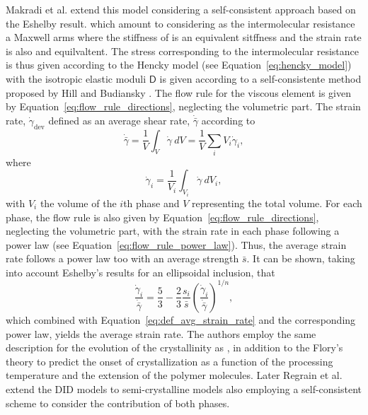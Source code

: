 Makradi et al. \citep{makradiTwophaseSelfconsistentModel2005} extend this model considering a self-consistent approach based on the Eshelby result.
 which amount to considering as the intermolecular resistance a Maxwell arms where the stiffness of is an equivalent sitffness and the strain rate is also and equilvaltent.
The stress corresponding to the intermolecular resistance is thus given according to the Hencky model (see Equation~\eqref{eq:hencky_model}) with the isotropic elastic moduli $\bm{\mathsf D}$ is given according to a self-consistente method proposed by Hill \citep{hillSelfconsistentMechanicsComposite1965} and Budiansky \citep{Budiansky}.
The flow rule for the viscous element is given by Equation~\eqref{eq:flow_rule_directions}, neglecting the volumetric part.
The strain rate, $\dot \gamma_\text{dev}$ defined as an average shear rate, $\dot{\bar\gamma}$ according to
\begin{equation}
	\label{eq:def_avg_strain_rate}
	\dot{\bar\gamma} = \frac{1}{V}\int_V \dot \gamma\ dV = \frac{1}{V}\sum_i V_i \dot{\gamma}_i,
\end{equation}
where
\begin{equation}
	\dot \gamma_i = \frac{1}{V_i}\int_{V_i} \dot \gamma\ dV_i,
\end{equation}
with $V_i$ the volume of the $i$th phase and $V$ representing the total volume.
For each phase, the flow rule is also given by Equation~\eqref{eq:flow_rule_directions}, neglecting the volumetric part, with the strain rate in each phase following a power law (see Equation~\eqref{eq:flow_rule_power_law}).
Thus, the average strain rate follows a power law too with an average strength $\bar s$.
It can be shown, taking into account Eshelby's results for an ellipsoidal inclusion, that
\begin{equation}
	\frac{\dot \gamma_i}{\dot{\bar \gamma}} = \frac{5}{3} - \frac{2}{3}\frac{s_i}{\bar s} \left(\frac{\dot \gamma_i}{\dot{\bar \gamma}}\right)^{1/n},
\end{equation}
which combined with Equation~\eqref{eq:def_avg_strain_rate} and the corresponding power law, yields the average strain rate.
The authors employ the same description for the evolution of the crystallinity as \cite{ahziModelingDeformationBehavior2003}, in addition to the Flory’s theory to predict the onset of crystallization as a function of the processing temperature and the extension of the polymer molecules.
Later Regrain et al. \citep{regrainMultimechanismModelsSemicrystalline2009} extend the DID models to semi-crystalline models also employing a self-consistent scheme to consider the contribution of both phases.

